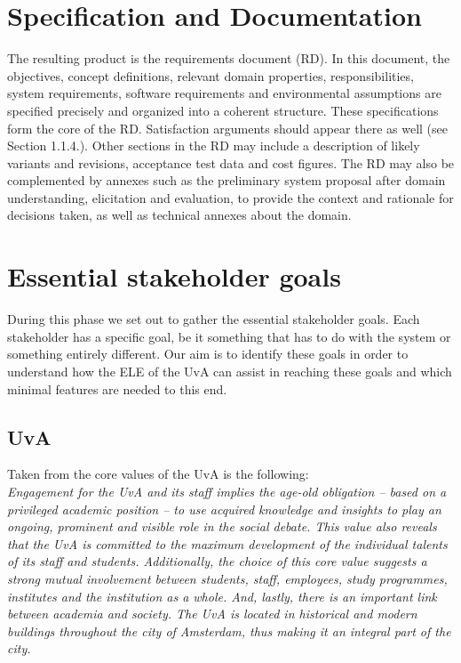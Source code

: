 \chapter{Specification and Documentation}
The resulting product is the requirements document (RD). In this document, the objectives,
concept definitions, relevant domain properties, responsibilities, system requirements, software
requirements and environmental assumptions are specified precisely and organized into a
coherent structure. These specifications form the core of the RD. Satisfaction arguments should
appear there as well (see Section 1.1.4.). Other sections in the RD may include a description
of likely variants and revisions, acceptance test data and cost figures. The RD may also be
complemented by annexes such as the preliminary system proposal after domain understanding,
elicitation and evaluation, to provide the context and rationale for decisions taken, as well as
technical annexes about the domain. 

\chapter{Essential stakeholder goals}\label{stakeholder_goals}
During this phase we set out to gather the essential stakeholder goals. Each stakeholder has a specific goal, be it something that has to do with the system or something entirely different. Our aim is to identify these goals in order to understand how the ELE of the UvA can assist in reaching these goals and which minimal features are needed to this end.

\section{UvA}
\label{uva_goals}
Taken from the core values of the UvA is the following: \\
\textit{Engagement for the UvA and its staff implies the age-old obligation – based on a privileged academic position – to use acquired knowledge and insights to play an ongoing, prominent and visible role in the social debate. This value also reveals that the UvA is committed to the maximum development of the individual talents of its staff and students. Additionally, the choice of this core value suggests a strong mutual involvement between students, staff, employees, study programmes, institutes and the institution as a whole. And, lastly, there is an important link between academia and society. The UvA is located in historical and modern buildings throughout the city of Amsterdam, thus making it an integral part of the city.}

